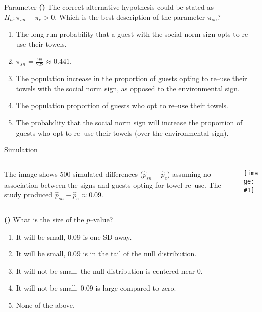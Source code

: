 \documentclass[13pt]{beamer}
\newcounter{count}
\newcommand{\question}{ \textbf{(\decimal{count})} \stepcounter{count}}
\newcommand{\pic}[2]{\hfill\texttt{[image: \#1]}\hspace*{\fill}}
\newenvironment{click}{\begin{enumerate}[A]}{\end{enumerate}}
\begin{document}
\begin{frame}{Parameter}
\question The correct alternative hypothesis could be stated as $H_a: \pi_{sn} - \pi_e > 0$. Which is the best description of the parameter $\pi_{sn}$?
\begin{click}
   \item The long run probability that a guest with the social norm sign opts to re--use their towels.%
   \item $\pi_{sn} = \frac{98}{222} \approx 0.441$.
   \item The population increase in the proportion of guests opting to re--use their towels with the social norm sign, as opposed to the environmental sign.
   \item The population proportion of guests who opt to re--use their towels.
   \item The probability that the social norm sign will increase the proportion of guests who opt to re--use their towels (over the environmental sign).
\end{click}
\end{frame}

\begin{frame}{Simulation}
\begin{columns}[onlytextwidth]
\begin{column}{.45\textwidth}
The image shows 500 simulated differences ($\hat{p}_{sn} - \hat{p}_e$) assuming no association between the signs and guests opting for towel re--use. The study produced $\hat{p}_{sn} - \hat{p}_e \approx 0.09$.
\end{column}
\begin{column}{.65\textwidth}
\pic{towelsimapplet.PNG}{0.93}
\end{column}
\end{columns}
\question What is the size of the $p$--value? %
\begin{click}
   \item It will be small, 0.09 is one SD away.
   \item It will be small, 0.09 is in the tail of the null distribution. %
   \item It will not be small, the null distribution is centered near 0.
   \item It will not be small, 0.09 is large compared to zero.
   \item None of the above.
\end{click}
\end{frame}
\end{document}
